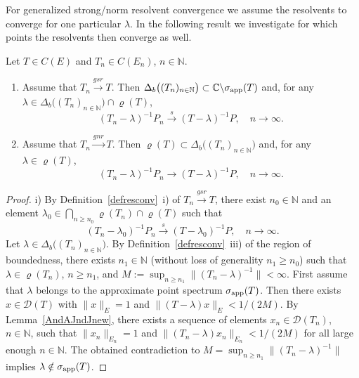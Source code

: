 \documentclass[a4paper,reqno]{amsart}
\begin{document}
{For generalized strong/norm resolvent convergence we assume the resolvents to converge for one particular $\lambda$.
In the following result we investigate for which points the resolvents then converge as well.
\begin{prop}\label{propgsrgnrregionofbdd}
Let $T\in C(E)$ and $T_n\in C(E_n)$, $n\in{\mathbb{N}}$. 
\begin{enumerate}[label=\rm{\roman{*})}]
\item Assume that $T_n{\stackrel{gsr}{\rightarrow}} T$. Then
$\Delta_b\big((T_n)_{n\in{\mathbb{N}}}\big)\subset{\mathbb{C}}\backslash \sigma_{\rm app}(T)$ and, for any $\lambda\in\Delta_b\big((T_n)_{n\in{\mathbb{N}}}\big)\cap\varrho(T)$, \begin{equation} (T_n-\lambda)^{-1}P_n{\stackrel{s}{\longrightarrow}}(T-\lambda)^{-1}P, \quad n\to\infty.\label{eqconvtoshow}\end{equation}
\item Assume that $T_n{\stackrel{gnr}{\rightarrow}} T$. Then $\varrho(T)\subset\Delta_b\big((T_n)_{n\in{\mathbb{N}}}\big)$ and, for any $\lambda\in\varrho(T)$, \begin{equation} (T_n-\lambda)^{-1}P_n{\longrightarrow}(T-\lambda)^{-1}P, \quad n\to\infty.\label{eqconvtoshow2}\end{equation}
\end{enumerate}
\end{prop}

\begin{proof}
i) By Definition~\ref{defresconv}~i) of $T_n{\stackrel{gsr}{\rightarrow}} T$, there exist $n_0\in{\mathbb{N}}$ and an element $\lambda_0\in\underset{n\geq n_0}{\bigcap}\varrho(T_n)\cap\varrho(T)$ such that \vspace{-2mm}
\begin{equation} (T_n-\lambda_0)^{-1}P_n{\stackrel{s}{\longrightarrow}} (T-\lambda_0)^{-1}P, \quad n\to\infty.\label{eqRnslongR}\end{equation}
Let $\lambda\in\Delta_b\big((T_n)_{n\in{\mathbb{N}}}\big)$. 
By Definition~\ref{defresconv}~iii) of the region of boundedness, there exists $n_1\in{\mathbb{N}}$ (without loss of generality $n_1\geq n_0$) 
such that $\lambda\in\varrho(T_n)$, $n\geq n_1$, and $M:=\sup_{n\geq n_1}\|(T_n-\lambda)^{-1}\|<\infty$.
First assume that $\lambda$ belongs to the approximate point spectrum $\sigma_{\rm app}(T)$. Then there exists $x\in{\mathcal D}(T)$ with $\|x\|_E=1$ and $\|(T-\lambda)x\|_E<1/(2M)$.
By Lemma~\ref{AndAJndJnew}, there exists a sequence of elements $x_n\in{\mathcal D}(T_n)$, $n\in{\mathbb{N}}$, such that $\|x_n\|_{E_n}=1$ and $\|(T_n-\lambda)x_n\|_{E_n}<1/(2M)$ for all large enough $n\in{\mathbb{N}}$.
The obtained contradiction to $M=\sup_{n\geq n_1}\|(T_n-\lambda)^{-1}\|$ implies $\lambda\notin\sigma_{\rm app}(T)$.


\end{proof}}
\end{document}
